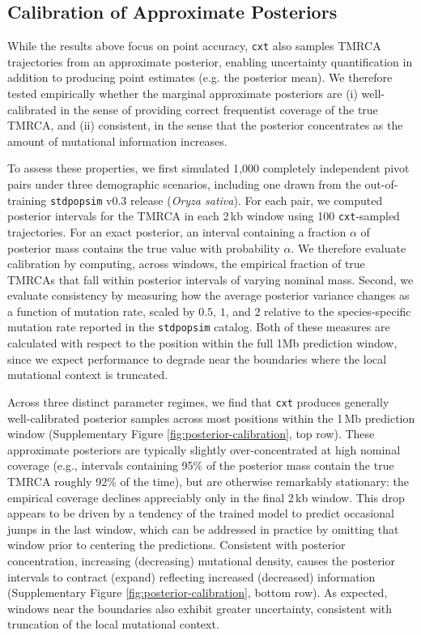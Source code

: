 \documentclass[9pt,twoside]{pnas-new}
\newcommand{\cxtkit}{\texttt{cxt}\xspace}
\newcommand{\stdpopsim}{\texttt{stdpopsim}\xspace}
\begin{document}
\subsection*{Calibration of Approximate Posteriors}
\label{sec:calibration}

While the results above focus on point accuracy, \cxtkit also samples TMRCA trajectories from an approximate posterior, 
enabling uncertainty quantification in addition to producing point estimates (e.g. the posterior mean). 
We therefore tested empirically
whether the marginal approximate posteriors are (i) well-calibrated in the sense of providing correct frequentist
coverage of the true TMRCA, 
and (ii) consistent, in the sense that the posterior concentrates as the amount of mutational information increases.

To assess these properties, we first simulated 1{,}000 completely independent pivot pairs under three demographic scenarios, 
including one drawn from the out-of-training \stdpopsim v0.3 release (\emph{Oryza sativa}).
For each pair, we computed posterior intervals for the TMRCA in each 2\,kb window using
100 \cxtkit-sampled trajectories. 
For an exact posterior, an interval containing a fraction $\alpha$ of posterior mass contains the true value with probability $\alpha$. We therefore evaluate calibration by computing, across windows, the empirical fraction of true TMRCAs
that fall within posterior intervals of varying nominal mass. 
Second, we evaluate consistency by measuring how the average posterior variance changes as a function of mutation rate,
scaled by $0.5$, $1$, and $2$ relative to the species-specific mutation rate reported in the \stdpopsim catalog. 
Both of these measures are calculated with respect to the position within the full 1Mb prediction window,
since we expect performance to degrade near the
boundaries where the local mutational context is truncated.

Across three distinct parameter regimes, 
we find that \cxtkit produces generally well-calibrated posterior samples across
most positions within the 1\,Mb prediction window (Supplementary Figure \ref{fig:posterior-calibration}, top row). 
These approximate posteriors are typically slightly
over-concentrated at high nominal coverage (e.g., intervals containing 95\% of the posterior mass contain the true
TMRCA roughly 92\% of the time), 
but are otherwise remarkably stationary: the empirical coverage declines appreciably only in the final 2\,kb window. 
This drop appears to be driven by a tendency of the trained model to predict occasional jumps in the last window,
which can be addressed in practice by omitting that window prior to centering the predictions. 
Consistent with posterior concentration,
increasing (decreasing) mutational density, causes the posterior intervals to contract (expand)
reflecting increased (decreased) information (Supplementary Figure \ref{fig:posterior-calibration}, bottom row). 
As expected, windows near the boundaries also exhibit greater uncertainty, consistent with truncation of the local mutational context.
\end{document}
